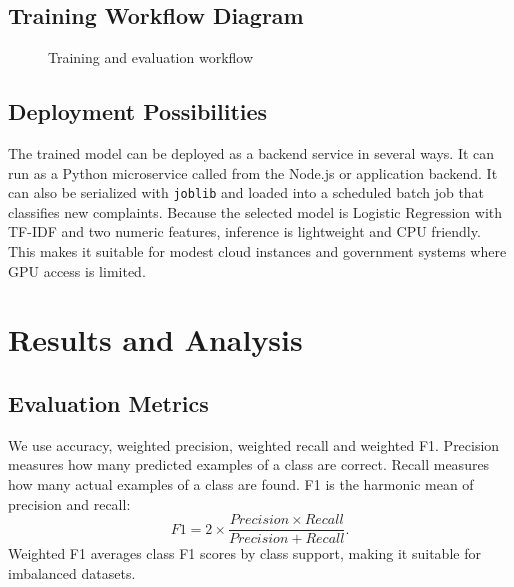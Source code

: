 \documentclass[12pt,a4paper,openany]{book}
\begin{document}
\section{Training Workflow Diagram}
\begin{figure}[H]
\centering
{}
\caption{Training and evaluation workflow}
\label{fig:training_workflow}
\end{figure}

\section{Deployment Possibilities}
The trained model can be deployed as a backend service in several ways. It can run as a Python microservice called from the Node.js or application backend. It can also be serialized with \texttt{joblib} and loaded into a scheduled batch job that classifies new complaints. Because the selected model is Logistic Regression with TF-IDF and two numeric features, inference is lightweight and CPU friendly. This makes it suitable for modest cloud instances and government systems where GPU access is limited.

\chapter{Results and Analysis}

\section{Evaluation Metrics}
We use accuracy, weighted precision, weighted recall and weighted F1. Precision measures how many predicted examples of a class are correct. Recall measures how many actual examples of a class are found. F1 is the harmonic mean of precision and recall:
\begin{equation}
F1=2\times\frac{Precision\times Recall}{Precision+Recall}.
\end{equation}
Weighted F1 averages class F1 scores by class support, making it suitable for imbalanced datasets.
\end{document}
